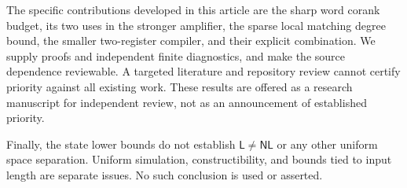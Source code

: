 The specific contributions developed in this article are the sharp
word corank budget, its two uses in the stronger amplifier,
the sparse local matching degree bound, the smaller two-register
compiler, and their explicit combination. We supply proofs and
independent finite diagnostics, and make the source dependence
reviewable. A targeted literature and repository review cannot
certify priority against all existing work. These results are
offered as a research manuscript for independent review, not as
an announcement of established priority.

Finally, the state lower bounds do not establish $\mathsf{L}\ne
\mathsf{NL}$ or any other uniform space separation. Uniform
simulation, constructibility, and bounds tied to input length
are separate issues. No such conclusion is used or asserted.

